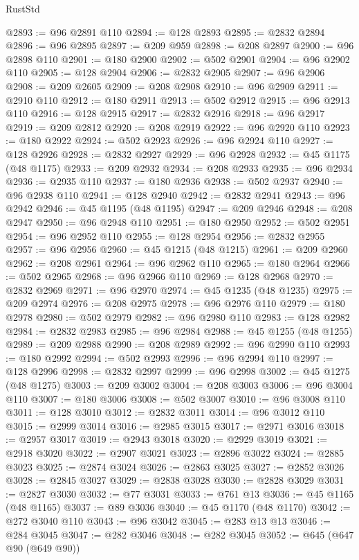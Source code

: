 \begin{lexlean}{RustStd}
\begin{coremodule}
@2893 := @96 @2891 @110
@2894 := @128 @2893
@2895 := @2832 @2894
@2896 := @96 @2895
@2897 := @209 @959
@2898 := @208 @2897
@2900 := @96 @2898 @110
@2901 := @180 @2900
@2902 := @502 @2901
@2904 := @96 @2902 @110
@2905 := @128 @2904
@2906 := @2832 @2905
@2907 := @96 @2906
@2908 := @209 @2605
@2909 := @208 @2908
@2910 := @96 @2909
@2911 := @2910 @110
@2912 := @180 @2911
@2913 := @502 @2912
@2915 := @96 @2913 @110
@2916 := @128 @2915
@2917 := @2832 @2916
@2918 := @96 @2917
@2919 := @209 @2812
@2920 := @208 @2919
@2922 := @96 @2920 @110
@2923 := @180 @2922
@2924 := @502 @2923
@2926 := @96 @2924 @110
@2927 := @128 @2926
@2928 := @2832 @2927
@2929 := @96 @2928
@2932 := @45 @1175 (@48 @1175)
@2933 := @209 @2932
@2934 := @208 @2933
@2935 := @96 @2934
@2936 := @2935 @110
@2937 := @180 @2936
@2938 := @502 @2937
@2940 := @96 @2938 @110
@2941 := @128 @2940
@2942 := @2832 @2941
@2943 := @96 @2942
@2946 := @45 @1195 (@48 @1195)
@2947 := @209 @2946
@2948 := @208 @2947
@2950 := @96 @2948 @110
@2951 := @180 @2950
@2952 := @502 @2951
@2954 := @96 @2952 @110
@2955 := @128 @2954
@2956 := @2832 @2955
@2957 := @96 @2956
@2960 := @45 @1215 (@48 @1215)
@2961 := @209 @2960
@2962 := @208 @2961
@2964 := @96 @2962 @110
@2965 := @180 @2964
@2966 := @502 @2965
@2968 := @96 @2966 @110
@2969 := @128 @2968
@2970 := @2832 @2969
@2971 := @96 @2970
@2974 := @45 @1235 (@48 @1235)
@2975 := @209 @2974
@2976 := @208 @2975
@2978 := @96 @2976 @110
@2979 := @180 @2978
@2980 := @502 @2979
@2982 := @96 @2980 @110
@2983 := @128 @2982
@2984 := @2832 @2983
@2985 := @96 @2984
@2988 := @45 @1255 (@48 @1255)
@2989 := @209 @2988
@2990 := @208 @2989
@2992 := @96 @2990 @110
@2993 := @180 @2992
@2994 := @502 @2993
@2996 := @96 @2994 @110
@2997 := @128 @2996
@2998 := @2832 @2997
@2999 := @96 @2998
@3002 := @45 @1275 (@48 @1275)
@3003 := @209 @3002
@3004 := @208 @3003
@3006 := @96 @3004 @110
@3007 := @180 @3006
@3008 := @502 @3007
@3010 := @96 @3008 @110
@3011 := @128 @3010
@3012 := @2832 @3011
@3014 := @96 @3012 @110
@3015 := @2999 @3014
@3016 := @2985 @3015
@3017 := @2971 @3016
@3018 := @2957 @3017
@3019 := @2943 @3018
@3020 := @2929 @3019
@3021 := @2918 @3020
@3022 := @2907 @3021
@3023 := @2896 @3022
@3024 := @2885 @3023
@3025 := @2874 @3024
@3026 := @2863 @3025
@3027 := @2852 @3026
@3028 := @2845 @3027
@3029 := @2838 @3028
@3030 := @2828 @3029
@3031 := @2827 @3030
@3032 := @77 @3031
@3033 := @761 @13
@3036 := @45 @1165 (@48 @1165)
@3037 := @89 @3036
@3040 := @45 @1170 (@48 @1170)
@3042 := @272 @3040 @110
@3043 := @96 @3042
@3045 := @283 @13 @13
@3046 := @284 @3045
@3047 := @282 @3046
@3048 := @282 @3045
@3052 := @645 (@647 @90 (@649 @90))

\end{coremodule}
\end{lexlean}
